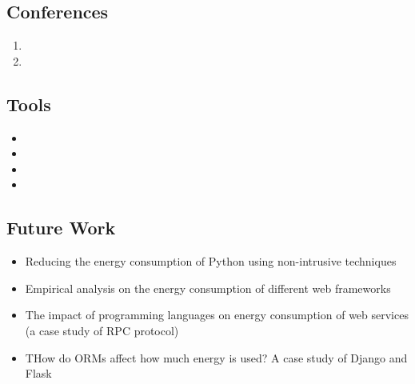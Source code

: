 \subsection*{Conferences}
\nobibliography*
\begin{enumerate}
    \item {}
    \item {}
\end{enumerate}

\subsection*{Tools}
\begin{itemize}
    \item {}
    \item {}
    \item {}
    \item {}
\end{itemize}

\subsection*{Future Work}
\begin{itemize}
    \item Reducing the energy consumption of Python using non-intrusive techniques
    \item Empirical analysis on the energy consumption of different web frameworks
    \item The impact of programming languages on energy consumption of web services (a case study of RPC protocol)
    \item THow do ORMs affect how much energy is used? A case study of Django and Flask
\end{itemize}


\cleardoublepage
